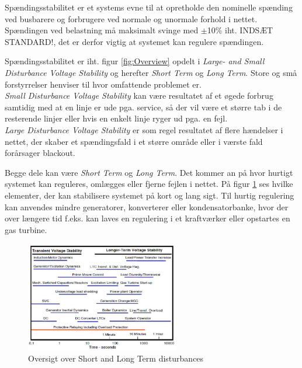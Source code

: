 
\label{Spaendingsstabilitet}

Spændingsstabilitet er et systems evne til at opretholde den nominelle spænding ved busbarere og forbrugere ved normale og unormale forhold i nettet. Spændingen ved belastning må maksimalt svinge med $\pm$10\% iht. INDSÆT STANDARD!, det er derfor vigtig at systemet kan regulere spændingen.  

Spændingsstabilitet er iht. figur \ref{fig:Overview} opdelt i \textit{Large- and Small Disturbance Voltage Stability} og herefter \textit{Short Term} og \textit{Long Term}. Store og små forstyrrelser henviser til hvor omfattende problemet er. \\
\textit{Small Disturbance Voltage Stability} kan være resultatet af et øgede forbrug samtidig med at en linje er ude pga. service, så der vil være et større tab i de resterende linjer eller hvis en enkelt linje ryger ud pga. en fejl.\\
\textit{Large Disturbance Voltage Stability} er som regel resultatet af flere hændelser i nettet, der skaber et spændingsfald i et større område eller i værste fald forårsager blackout.

Begge dele kan være \textit{Short Term} og \textit{Long Term}. Det kommer an på hvor hurtigt systemet kan reguleres, omlægges eller fjerne fejlen i nettet. På figur \ref{fig:VoltageTime} ses hvilke elementer, der kan stabilisere systemet på kort og lang sigt. Til hurtig regulering kan anvendes mindre generatorer, konverterer eller kondensatorbanke, hvor der over længere tid f.eks. kan laves en regulering i et kraftværker eller opstartes en gas turbine.  

\begin{figure}[H] %
	\centering
	\includegraphics[width=0.6\textwidth]{figurer/Voltage_time}
	\caption{Oversigt over Short and Long Term disturbances}
	\label{fig:VoltageTime}
\end{figure}

